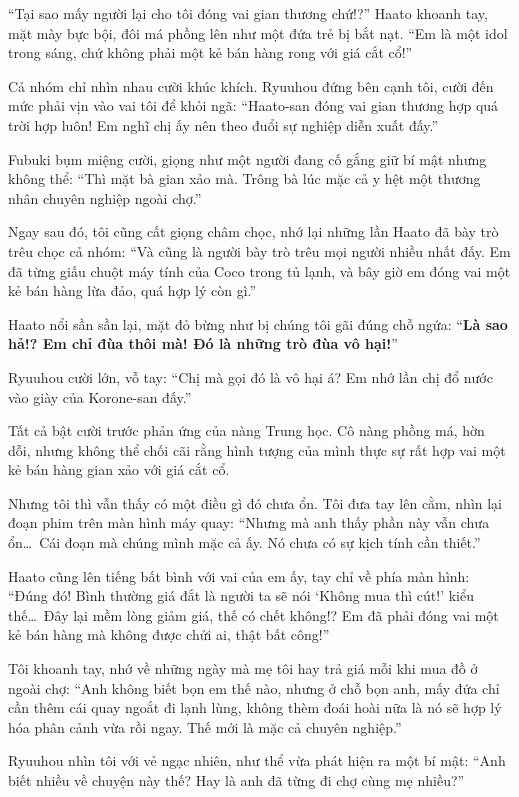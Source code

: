 \documentclass[../main.tex]{subfiles}
\begin{document}
``Tại sao mấy người lại cho tôi đóng vai gian thương chứ!?'' Haato khoanh tay, mặt mày bực bội, đôi má phồng lên như một đứa trẻ bị bắt nạt. ``Em là một idol trong sáng, chứ không phải một kẻ bán hàng rong với giá cắt cổ!''

Cả nhóm chỉ nhìn nhau cười khúc khích. Ryuuhou đứng bên cạnh tôi, cười đến mức phải vịn vào vai tôi để khỏi ngã: ``Haato-san đóng vai gian thương hợp quá trời hợp luôn! Em nghĩ chị ấy nên theo đuổi sự nghiệp diễn xuất đấy.''

Fubuki bụm miệng cười, giọng như một người đang cố gắng giữ bí mật nhưng không thể: ``Thì mặt bà gian xảo mà. Trông bà lúc mặc cả y hệt một thương nhân chuyên nghiệp ngoài chợ.''

Ngay sau đó, tôi cũng cất giọng châm chọc, nhớ lại những lần Haato đã bày trò trêu chọc cả nhóm: ``Và cũng là người bày trò trêu mọi người nhiều nhất đấy. Em đã từng giấu chuột máy tính của Coco trong tủ lạnh, và bây giờ em đóng vai một kẻ bán hàng lừa đảo, quá hợp lý còn gì.''

Haato nổi sần sần lại, mặt đỏ bừng như bị chúng tôi gãi đúng chỗ ngứa: ``\textbf{Là sao hả!? Em chỉ đùa thôi mà! Đó là những trò đùa vô hại!}''

Ryuuhou cười lớn, vỗ tay: ``Chị mà gọi đó là vô hại á? Em nhớ lần chị đổ nước vào giày của Korone-san đấy.''

Tất cả bật cười trước phản ứng của nàng Trung học. Cô nàng phồng má, hờn dỗi, nhưng không thể chối cãi rằng hình tượng của mình thực sự rất hợp vai một kẻ bán hàng gian xảo với giá cắt cổ.

Nhưng tôi thì vẫn thấy có một điều gì đó chưa ổn. Tôi đưa tay lên cằm, nhìn lại đoạn phim trên màn hình máy quay: ``Nhưng mà anh thấy phần này vẫn chưa ổn\dots\ Cái đoạn mà chúng mình mặc cả ấy. Nó chưa có sự kịch tính cần thiết.''

Haato cũng lên tiếng bất bình với vai của em ấy, tay chỉ về phía màn hình: ``Đúng đó! Bình thường giá đắt là người ta sẽ nói `Không mua thì cút!' kiểu thế\dots\ Đây lại mềm lòng giảm giá, thế có chết không!? Em đã phải đóng vai một kẻ bán hàng mà không được chửi ai, thật bất công!''

Tôi khoanh tay, nhớ về những ngày mà mẹ tôi hay trả giá mỗi khi mua đồ ở ngoài chợ: ``Anh không biết bọn em thế nào, nhưng ở chỗ bọn anh, mấy đứa chỉ cần thêm cái quay ngoắt đi lạnh lùng, không thèm đoái hoài nữa là nó sẽ hợp lý hóa phân cảnh vừa rồi ngay. Thế mới là mặc cả chuyên nghiệp.''

Ryuuhou nhìn tôi với vẻ ngạc nhiên, như thể vừa phát hiện ra một bí mật: ``Anh biết nhiều về chuyện này thế? Hay là anh đã từng đi chợ cùng mẹ nhiều?''
\end{document}
